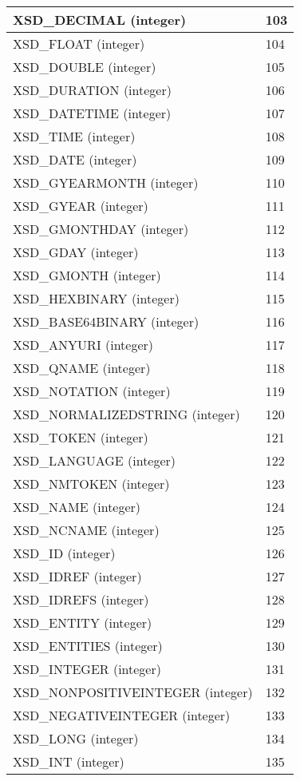 \begin{longtable}{|m{150pt}|m{100pt}|}
\hline
XSD\_DECIMAL (integer)	&103	 \\
\hline
XSD\_FLOAT (integer)	&104	 \\
\hline
XSD\_DOUBLE (integer)	&105	 \\
\hline
XSD\_DURATION (integer)	&106	 \\
\hline
XSD\_DATETIME (integer)	&107	 \\
\hline
XSD\_TIME (integer)	&108	 \\
\hline
XSD\_DATE (integer)	&109	 \\
\hline
XSD\_GYEARMONTH (integer)	&110	 \\
\hline
XSD\_GYEAR (integer)	&111	 \\
\hline
XSD\_GMONTHDAY (integer)	&112	 \\
\hline
XSD\_GDAY (integer)	&113	 \\
\hline
XSD\_GMONTH (integer)	&114	 \\
\hline
XSD\_HEXBINARY (integer)	&115	 \\
\hline
XSD\_BASE64BINARY (integer)	&116	 \\
\hline
XSD\_ANYURI (integer)	&117	 \\
\hline
XSD\_QNAME (integer)	&118	 \\
\hline
XSD\_NOTATION (integer)	&119	 \\
\hline
XSD\_NORMALIZEDSTRING (integer)	&120	 \\
\hline
XSD\_TOKEN (integer)	&121	 \\
\hline
XSD\_LANGUAGE (integer)	&122	 \\
\hline
XSD\_NMTOKEN (integer)	&123	 \\
\hline
XSD\_NAME (integer)	&124	 \\
\hline
XSD\_NCNAME (integer)	&125	 \\
\hline
XSD\_ID (integer)	&126	 \\
\hline
XSD\_IDREF (integer)	&127	 \\
\hline
XSD\_IDREFS (integer)	&128	 \\
\hline
XSD\_ENTITY (integer)	&129	 \\
\hline
XSD\_ENTITIES (integer)	&130	 \\
\hline
XSD\_INTEGER (integer)	&131	 \\
\hline
XSD\_NONPOSITIVEINTEGER (integer)	&132	 \\
\hline
XSD\_NEGATIVEINTEGER (integer)	&133	 \\
\hline
XSD\_LONG (integer)	&134	 \\
\hline
XSD\_INT (integer)	&135	 \\

\end{longtable}
